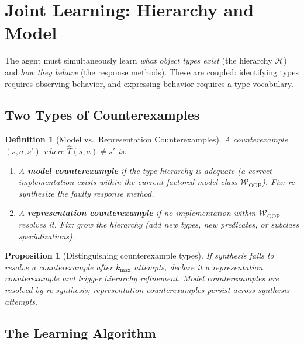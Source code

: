 \documentclass{article}
\newtheorem{definition}{Definition}
\newtheorem{proposition}{Proposition}
\newcommand{\calH}{\mathcal{H}}
\newcommand{\calW}{\mathcal{W}}
\begin{document}

\section{Joint Learning: Hierarchy and Model}
\label{sec:joint}

The agent must simultaneously learn \emph{what object types exist} (the
hierarchy $\calH$) and \emph{how they behave} (the response methods).  These
are coupled: identifying types requires observing behavior, and expressing
behavior requires a type vocabulary.

\subsection{Two Types of Counterexamples}
\label{sec:cx_types}

\begin{definition}[Model vs.\ Representation Counterexamples]
\label{def:cx_types}
A counterexample $(s, a, s')$ where $\hat{T}(s, a) \neq s'$ is:
\begin{enumerate}[nosep]
    \item A \textbf{model counterexample} if the type hierarchy is adequate
          (a correct implementation exists within the current factored model
          class $\calW_{\text{OOP}}$).  Fix: re-synthesize the faulty
          response method.
    \item A \textbf{representation counterexample} if no implementation within
          $\calW_{\text{OOP}}$ resolves it.  Fix: grow the hierarchy (add new
          types, new predicates, or subclass specializations).
\end{enumerate}
\end{definition}

\begin{proposition}[Distinguishing counterexample types]
\label{prop:distinguish}
If synthesis fails to resolve a counterexample after $k_{\max}$ attempts,
declare it a representation counterexample and trigger hierarchy refinement.
Model counterexamples are resolved by re-synthesis; representation
counterexamples persist across synthesis attempts.
\end{proposition}

\subsection{The Learning Algorithm}
\label{sec:algorithm}
\end{document}
